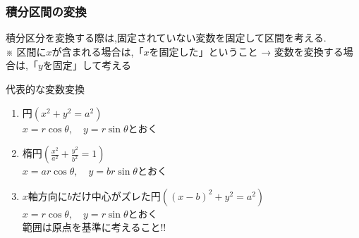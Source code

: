 \documentclass[a4paper]{jsarticle}
\begin{document}
\subsubsection{積分区間の変換}
積分区分を変換する際は,固定されていない変数を固定して区間を考える.\\
※ 区間に$x$が含まれる場合は,「$x$を固定した」ということ → 変数を変換する場合は,「$y$を固定」して考える
\begin{itembox}[l]{代表的な変数変換}
    \begin{enumerate}[(1)]
        \item 円\quad $\left(x^2+y^2=a^2\right)$\\
              $x=r\cos\theta,\quad y=r\sin\theta$とおく
        \item 楕円\quad $\left(\frac{x^2}{a^2}+\frac{y^2}{b^2}=1\right)$\\
              $x=ar\cos\theta,\quad y=br\sin\theta$とおく
        \item $x$軸方向に$b$だけ中心がズレた円\quad $\left(\left(x-b\right)^2+y^2=a^2\right)$\\
              $x=r\cos\theta,\quad y=r\sin\theta$とおく\\
              範囲は原点を基準に考えること!!
    \end{enumerate}
\end{itembox}
\end{document}
